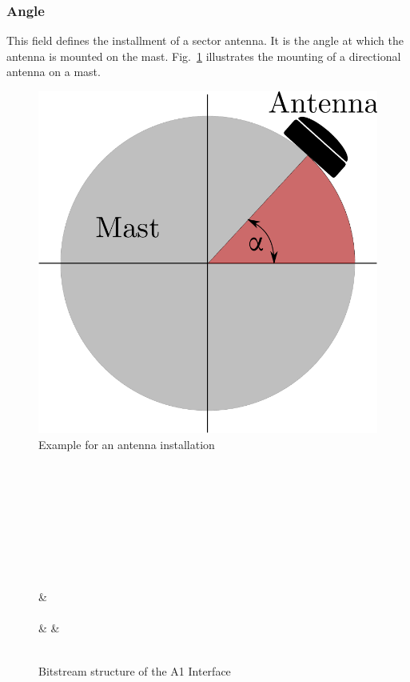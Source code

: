 \subsubsection{Angle}
This field defines the installment of a sector antenna. It is the angle at which the antenna is mounted on the mast. Fig.~\ref{fig:antennaangle} illustrates the mounting of a directional antenna on a mast.
% 
\begin{figure}
	\centering
	\includegraphics[width=0.4\linewidth]{./images/antennaangle}
	\caption{Example for an antenna installation} 
	\label{fig:antennaangle}
\end{figure}

\begin{figure}
	\begin{bytefield}[bitwidth=1.1em]{32}
		 \\
		 \\ 
		\skippedwords\\
		\\
		 \\
		 \\
		 \\
		 \\
		&\\
		\\
		& &  \\
		\\
	\end{bytefield}
	\caption{Bitstream structure of the A1 Interface}
	\label{fig:a1structure}
\end{figure}
